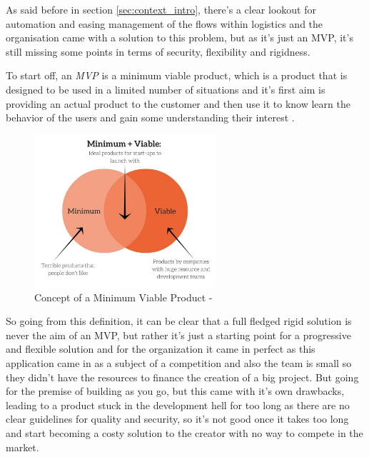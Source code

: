 As said before in section \ref{sec:context_intro}, there's a clear lookout for automation
and easing management of the flows within logistics and the organisation came with
a solution to this problem, but as it's just an MVP, it's still missing some points
in terms of security, flexibility and rigidness.

To start off, an \emph{MVP} is a minimum viable product, which is a product that
is designed to be used in a limited number of situations and it's first aim
is providing an actual product to the customer and then use it to know learn
the behavior of the users and gain some understanding their interest \cite{MVP_def}.

\begin{figure}[h]
    \centering
    \includegraphics[width=0.6\textwidth]{images/Minimum-Viable.jpg}
    \caption{Concept of a Minimum Viable Product - \cite{MVP_def}}
    \label{fig:mvp}
\end{figure}

So going from this definition, it can be clear that a full fledged rigid
solution is never the aim of an MVP, but rather it's just a starting point
for a progressive and flexible solution and for the organization it came in
perfect as this application came in as a subject of a competition and
also the team is small so they didn't have the resources to finance
the creation of a big project. But going for the premise of building as you go,
but this came with it's own drawbacks, leading to a product stuck in the development
hell for too long as there are no clear guidelines for quality and security, so it's
not good once it takes too long and start becoming a costy solution to the creator
with no way to compete in the market.

